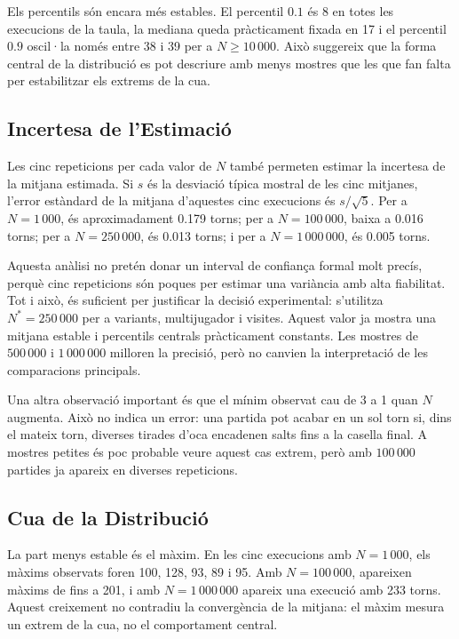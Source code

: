 \documentclass[conference,compsoc]{IEEEtran}
\begin{document}
Els percentils són encara més estables. El percentil $0.1$ és 8 en totes les
execucions de la taula, la mediana queda pràcticament fixada en 17 i el percentil
$0.9$ oscil·la només entre 38 i 39 per a $N\geq10\,000$. Això suggereix que la
forma central de la distribució es pot descriure amb menys mostres que les que fan
falta per estabilitzar els extrems de la cua.

\subsection{Incertesa de l'Estimació}

Les cinc repeticions per cada valor de $N$ també permeten estimar la incertesa de
la mitjana estimada. Si $s$ és la desviació típica mostral de les cinc mitjanes,
l'error estàndard de la mitjana d'aquestes cinc execucions és $s/\sqrt{5}$. Per a
$N=1\,000$, és aproximadament 0.179 torns; per a $N=100\,000$, baixa a 0.016 torns;
per a $N=250\,000$, és 0.013 torns; i per a $N=1\,000\,000$, és 0.005 torns.

Aquesta anàlisi no pretén donar un interval de confiança formal molt precís, perquè
cinc repeticions són poques per estimar una variància amb alta fiabilitat. Tot i
això, és suficient per justificar la decisió experimental: s'utilitza
$N^*=250\,000$ per a variants, multijugador i visites. Aquest valor ja mostra una
mitjana estable i percentils centrals pràcticament constants. Les mostres de
$500\,000$ i $1\,000\,000$ milloren la precisió, però no canvien la interpretació
de les comparacions principals.

Una altra observació important és que el mínim observat cau de 3 a 1 quan $N$
augmenta. Això no indica un error: una partida pot acabar en un sol torn si, dins
el mateix torn, diverses tirades d'oca encadenen salts fins a la casella final. A
mostres petites és poc probable veure aquest cas extrem, però amb $100\,000$
partides ja apareix en diverses repeticions.

\subsection{Cua de la Distribució}

La part menys estable és el màxim. En les cinc execucions amb $N=1\,000$, els màxims
observats foren 100, 128, 93, 89 i 95. Amb $N=100\,000$, apareixen màxims de fins a
201, i amb $N=1\,000\,000$ apareix una execució amb 233 torns. Aquest creixement no
contradiu la convergència de la mitjana: el màxim mesura un extrem de la cua, no el
comportament central.
\end{document}
